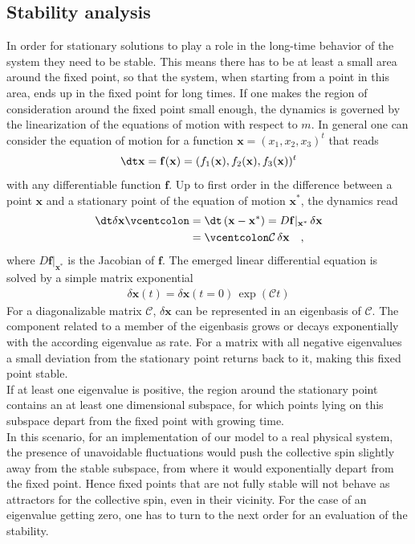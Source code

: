 \subsection{Stability analysis}
In order for stationary solutions to play a role in the long-time behavior of the system they need to be stable. This means there has to be at least a small area around the fixed point, so that the system, when starting from a point in this area, ends up in the fixed point for long times. If one makes the region of consideration around the fixed point small enough, the dynamics is governed by the linearization of the equations of motion with respect to $m$. In general one can consider the equation of motion for a function $\mathbf{x}=(x_1,x_2,x_3)^t$ that reads
\begin{align*}
    \dt \mathbf{x}=\mathbf{f}(\mathbf{x})=(f_1(\mathbf{x}),f_2(\mathbf{x}),f_3(\mathbf{x}))^t
\end{align*}
with any differentiable function $\mathbf{f}$. Up to first order in the difference between a point $\mathbf{x}$ and a stationary point of the equation of motion $\mathbf{x}^*$, the dynamics read 
\begin{align*}
    \dt \delta\mathbf{x} \vcentcolon&= \dt\,(\mathbf{x}-\mathbf{x}^*)=D\mathbf{f}|_{\mathbf{x}^*}\,\delta\mathbf{x}\\
    &=\vcentcolon\mathcal{C}\,\delta\mathbf{x}\quad,
\end{align*}
where $D\mathbf{f}|_{\mathbf{x}^*}$ is the Jacobian of $\mathbf{f}$. The emerged linear differential equation is solved by a simple matrix exponential
\begin{align*}
    \delta\mathbf{x}(t)=\delta\mathbf{x}(t=0)\,\exp(\mathcal{C}t)
\end{align*}
For a diagonalizable matrix $\mathcal{C}$, $\delta\mathbf{x}$ can be represented in an eigenbasis of $\mathcal{C}$. The component related to a member of the eigenbasis grows or decays exponentially with the according eigenvalue as rate. For a matrix with all negative eigenvalues a small deviation from the stationary point returns back to it, making this fixed point stable. \\If at least one eigenvalue is positive, the region around the stationary point contains an at least one dimensional subspace, for which points lying on this subspace depart from the fixed point with growing time. \\In this scenario, for an implementation of our model to a real physical system, the presence of unavoidable fluctuations would push the collective spin slightly away from the stable subspace, from where it would exponentially depart from the fixed point\cite{pikovskij_synchronization_2007}. Hence fixed points that are not fully stable will not behave as attractors for the collective spin, even in their vicinity. For the case of an eigenvalue getting zero, one has to turn to the next order for an evaluation of the stability.\\\\
